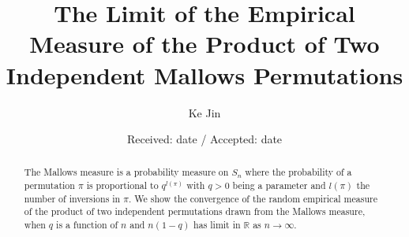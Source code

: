\newcommand{\ccirc}{\mathbin{\mathchoice
  {\xcirc\scriptstyle}
  {\xcirc\scriptstyle}
  {\xcirc\scriptscriptstyle}
  {\xcirc\scriptscriptstyle}
}}
\newcommand{\xcirc}[1]{\vcenter{\hbox{$#1\circ$}}}
\newcommand{\E}{\mathbb{E}}
\newcommand{\p}{\mathbb{P}}
\newcommand{\LL}{L_{\pi}}
\newcommand{\lx}{L_{\xi}}
\newcommand{\ft}{f_{R_{\delta}}}
\newcommand{\m}{\mu_{n, q}}
\newcommand{\n}{\mu_{n, q_n}}
\newcommand{\inv}{l}
\newcommand{\IV}{\text{Inv}}
\newcommand{\var}{\text{Var}}
\newcommand{\cov}{\text{Cov}}
\newcommand{\lis}{\text{LIS}}
\newcommand{\lds}{\text{LDS}}
\newcommand{\lcs}{\text{LCS}}
\newcommand{\bs}{\boldsymbol}




\title{The Limit of the Empirical Measure of the Product of Two Independent Mallows Permutations%
}


\author{Ke Jin         %
}



\date{Received: date / Accepted: date}


\maketitle

\begin{abstract}
The Mallows measure is a probability measure on $S_n$ where the probability of a permutation $\pi$ is proportional to $q^{l(\pi)}$ with $q > 0$ being a parameter and $l(\pi)$ the number of inversions in $\pi$. We show the convergence of the random empirical measure of the product of two independent permutations drawn from the Mallows measure, when $q$ is a function of $n$ and $n(1-q)$ has limit in $\mathbb{R}$ as $n \to \infty$.
\end{abstract}

